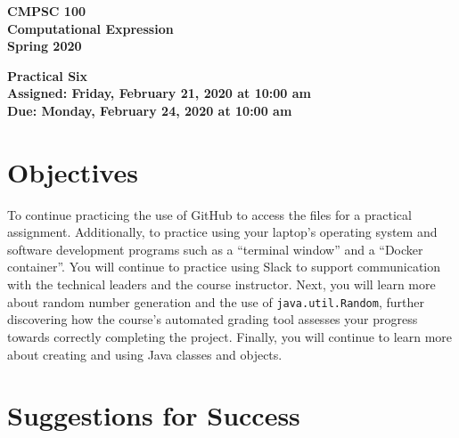 \documentclass[11pt]{article}
\newcommand{\assignmentduedate}{February 24}
\newcommand{\assignmentassignedate}{February 21}
\newcommand{\assignmentnumber}{Six}
\newcommand{\labyear}{2020}
\newcommand{\labdueday}{Monday}
\newcommand{\labassignday}{Friday}
\newcommand{\labtime}{10:00 am}
\newcommand{\assigneddate}{Assigned: \labassignday, \assignmentassignedate, \labyear{} at \labtime{}}
\newcommand{\duedate}{Due: \labdueday, \assignmentduedate, \labyear{} at \labtime{}}
\newcommand{\labtitle}[1]
{
  \begin{center}
    \begin{center}
      \bf
      CMPSC 100\\Computational Expression\\
      Spring 2020\\
      \medskip
    \end{center}
    \bf
    #1
  \end{center}
}
\begin{document}
\thispagestyle{empty}

\labtitle{Practical \assignmentnumber{} \\ \assigneddate{} \\ \duedate{}}

\section*{Objectives}

To continue practicing the use of GitHub to access the files for a practical
assignment. Additionally, to practice using your laptop's operating system and
software development programs such as a ``terminal window'' and a ``Docker
container''. You will continue to practice using Slack to support communication
with the technical leaders and the course instructor. Next, you will learn more
about random number generation and the use of {\tt java.util.Random}, further
discovering how the course's automated grading tool assesses your progress
towards correctly completing the project. Finally, you will continue to learn
more about creating and using Java classes and objects.

\section*{Suggestions for Success}
\end{document}
